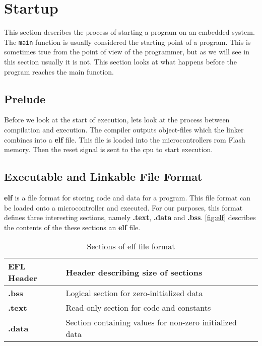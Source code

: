 \section{Startup}
\label{sec:back:startup}

This section describes the process of starting a program on an embedded system.
The \texttt{main} function is usually considered the starting point of a program.
This is sometimes true from the point of view of the programmer, but as we will see in this section usually it is not.
This section looks at what happens before the program reaches the main function.

\subsection{Prelude}

Before we look at the start of execution, lets look at the process between compilation and execution.
The compiler outputs object-files which the linker combines into a \textbf{elf} file.
This file is loaded into the microcontrollers \gls{rom} Flash memory.
Then the reset signal is sent to the \gls{cpu} to start execution.

\subsection{Executable and Linkable File Format}
\label{sec:back:elf}
\textbf{elf} is a file format for storing code and data for a program.
This file format can be loaded onto a microcontroller and executed.
For our purposes, this format defines three interesting sections, namely \textbf{.text}, \textbf{.data} and \textbf{.bss}.
\autoref{fig:elf} describes the contents of the these sections an \textbf{elf} file.

\begin{table}[H]
  \centering
  \begin{tabular}{|l|l|}
    \hline
    EFL Header & Header describing size of sections \\
    \hline
    \textbf{.bss} & Logical section for zero-initialized data \\
    \hline
    \textbf{.text} & Read-only section for code and constants \\
    \hline
    \textbf{.data} & Section containing values for non-zero initialized data \\
    \hline
  \end{tabular}
  \caption{Sections of elf file format}
  \label{fig:elf}
\end{table}

